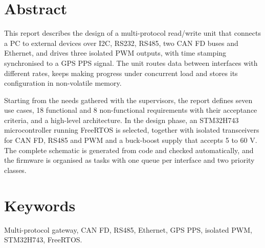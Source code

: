 \section*{Abstract}
This report describes the design of a multi-protocol read/write unit that
connects a PC to external devices over I2C, RS232, RS485, two CAN FD buses
and Ethernet, and drives three isolated PWM outputs, with time stamping
synchronised to a GPS PPS signal. The unit routes data between interfaces
with different rates, keeps making progress under concurrent load and
stores its configuration in non-volatile memory.

Starting from the needs gathered with the supervisors, the report defines
seven use cases, 18 functional and 8 non-functional requirements with
their acceptance criteria, and a high-level architecture. In the design
phase, an STM32H743 microcontroller running FreeRTOS is selected, together
with isolated transceivers for CAN FD, RS485 and PWM and a buck-boost
supply that accepts 5 to 60 V. The complete schematic is generated from
code and checked automatically, and the firmware is organised as tasks
with one queue per interface and two priority classes.

\section*{Keywords}
Multi-protocol gateway, CAN FD, RS485, Ethernet, GPS PPS, isolated PWM,
STM32H743, FreeRTOS.

